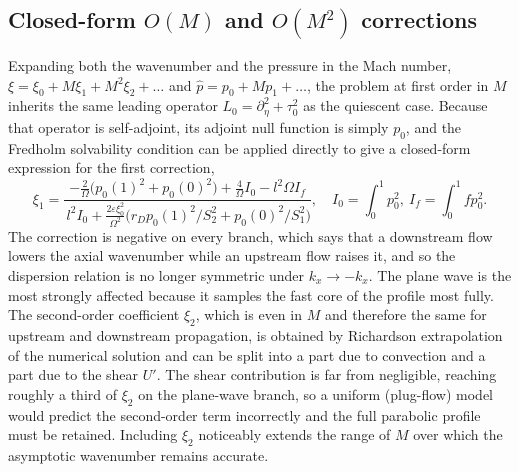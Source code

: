 \documentclass[11pt]{article}
\newcommand{\Om}{\Omega}
\newcommand{\eps}{\varepsilon}
\begin{document}
\subsection{Closed-form $O(M)$ and $O(M^2)$ corrections}
Expanding both the wavenumber and the pressure in the Mach number, $\xi=\xi_0+M\xi_1+M^2\xi_2+\dots$ and
$\hat p=p_0+Mp_1+\dots$, the problem at first order in $M$ inherits the same leading operator
$L_0=\partial_\eta^2+\tau_0^2$ as the quiescent case. Because that operator is self-adjoint, its adjoint
null function is simply $p_0$, and the Fredholm solvability condition can be applied directly to give a
closed-form expression for the first correction,
\begin{equation}
\xi_1=\frac{-\tfrac{2}{\Om}\big(p_0(1)^2+p_0(0)^2\big)+\tfrac{4}{\Om}I_0-l^2\Om I_f}
{\,l^2I_0+\tfrac{2\eps\xi_0^2}{\Om^2}\big(r_Dp_0(1)^2/S_2^2+p_0(0)^2/S_1^2\big)},
\quad I_0\!=\!\!\int_0^1\!\!p_0^2,\ I_f\!=\!\!\int_0^1\!\!f p_0^2 .
\label{eq:xi1}
\end{equation}
The correction is negative on every branch, which says that a downstream flow lowers the axial
wavenumber while an upstream flow raises it, and so the dispersion relation is no longer symmetric under
$k_x\to-k_x$. The plane wave is the most strongly affected because it samples the fast core of the
profile most fully. The second-order coefficient $\xi_2$, which is even in $M$ and therefore the same
for upstream and downstream propagation, is obtained by Richardson extrapolation of the numerical
solution and can be split into a part due to convection and a part due to the shear $U'$. The shear
contribution is far from negligible, reaching roughly a third of $\xi_2$ on the plane-wave branch, so a
uniform (plug-flow) model would predict the second-order term incorrectly and the full parabolic profile
must be retained. Including $\xi_2$ noticeably extends the range of $M$ over which the asymptotic
wavenumber remains accurate.
\end{document}

